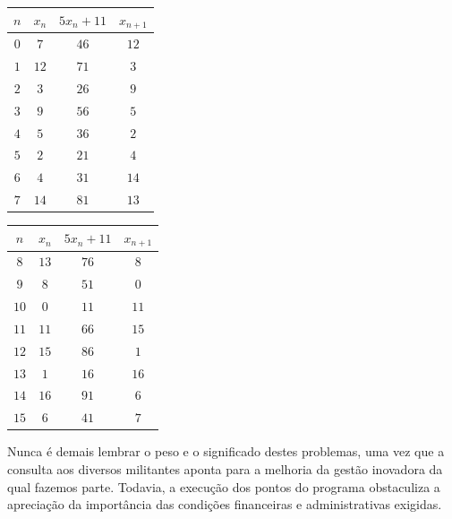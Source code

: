 \documentclass[fleqn]{icat-ufal}
\begin{document}
\begin{multicols}{2} %
    \begin{center}
        \vspace{0.8\baselineskip}
        \begin{tabular}{cccc}
        	\hline
        	$n$ & $x_n$ & $5x_n+11$ & $x_{n+1}$ \\ \hline
        	$0$ &  $7$  &   $46$    &   $12$    \\
        	$1$ & $12$  &   $71$    &    $3$    \\
        	$2$ &  $3$  &   $26$    &    $9$    \\
        	$3$ &  $9$  &   $56$    &    $5$    \\
        	$4$ &  $5$  &   $36$    &    $2$    \\
        	$5$ &  $2$  &   $21$    &    $4$    \\
        	$6$ &  $4$  &   $31$    &   $14$    \\
        	$7$ & $14$  &   $81$    &   $13$    \\ \hline
        \end{tabular}
    \end{center}
    \begin{center}
        \vspace{0.8\baselineskip}
        \begin{tabular}{cccc}
        	\hline
        	$n$  & $x_n$ & $5x_n+11$ & $x_{n+1}$ \\ \hline
        	$8$  & $13$  &   $76$    &    $8$    \\
        	$9$  &  $8$  &   $51$    &    $0$    \\
        	$10$ &  $0$  &   $11$    &   $11$    \\
        	$11$ & $11$  &   $66$    &   $15$    \\
        	$12$ & $15$  &   $86$    &    $1$    \\
        	$13$ &  $1$  &   $16$    &   $16$    \\
        	$14$ & $16$  &   $91$    &    $6$    \\
        	$15$ &  $6$  &   $41$    &    $7$    \\ \hline
        \end{tabular}
    \end{center}        
\end{multicols}

Nunca é demais lembrar o peso e o significado destes
problemas, uma vez que a consulta aos diversos militantes aponta para a melhoria
da gestão inovadora da qual fazemos parte. Todavia, a execução dos pontos do
programa obstaculiza a apreciação da importância das condições financeiras e
administrativas exigidas. 
\end{document}
